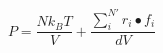 \documentclass[12pt]{article}
\begin{document}
$$
   P = \frac{N k_B T}{V} + \frac{\sum_{i}^{N'} r_i \bullet f_i}{dV}
$$
\end{document}
